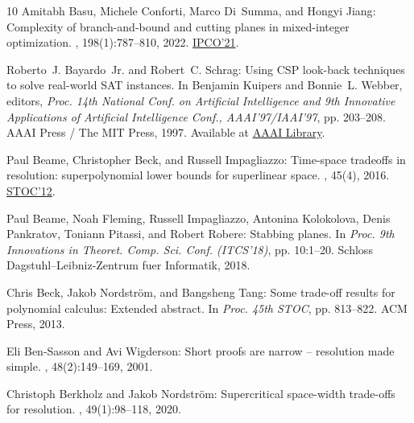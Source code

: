\begin{thebibliography}{10}
{\sc Amitabh Basu, Michele Conforti, Marco Di~Summa, and Hongyi Jiang}:
  Complexity of branch-and-bound and cutting planes in mixed-integer
  optimization.
, 198(1):787--810, 2022.
\newblock \prelim
  \href{https://doi.org/10.1007/978-3-030-73879-2\_27}{IPCO'21}.
\newblock [\epfmtdoi{10.1007/s10107-022-01789-5}]

{\sc Roberto~J. Bayardo~Jr. and Robert~C. Schrag}: Using {CSP} look-back
  techniques to solve real-world {SAT} instances.
\newblock In {\sc Benjamin Kuipers and Bonnie~L. Webber}, editors, {\em Proc.
  14th National Conf. on Artificial Intelligence and 9th Innovative
  Applications of Artificial Intelligence Conf., {AAAI}'97/{IAAI}'97}, pp.
  203--208. {AAAI} Press / The {MIT} Press, 1997.
\newblock Available at
  \href{http://www.aaai.org/Library/AAAI/1997/aaai97-032.php}{AAAI Library}.

{\sc Paul Beame, Christopher Beck, and Russell Impagliazzo}: Time-space
  tradeoffs in resolution: superpolynomial lower bounds for superlinear space.
, 45(4), 2016.
\newblock \prelim \href{https://doi.org/10.1145/2213977.2213999}{STOC'12}.
\newblock [\epfmtdoi{10.1137/130914085}]

{\sc Paul Beame, Noah Fleming, Russell Impagliazzo, Antonina Kolokolova, Denis
  Pankratov, Toniann Pitassi, and Robert Robere}: Stabbing planes.
\newblock In {\em Proc. 9th Innovations in Theoret. Comp. Sci. Conf.
  (ITCS'18)}, pp. 10:1--20. Schloss Dagstuhl--Leibniz-Zentrum fuer Informatik,
  2018.

{\sc Chris Beck, Jakob Nordstr{\"{o}}m, and Bangsheng Tang}: Some trade-off
  results for polynomial calculus: {E}xtended abstract.
\newblock In {\em Proc. 45th STOC}, pp. 813--822. ACM Press, 2013.
\newblock [\epfmtdoi{10.1145/2488608.2488711}]

{\sc Eli Ben{-}Sasson and Avi Wigderson}: Short proofs are narrow -- resolution
  made simple.
, 48(2):149--169, 2001.
\newblock [\epfmtdoi{10.1145/375827.375835}]

{\sc Christoph Berkholz and Jakob Nordstr{\"{o}}m}: Supercritical space-width
  trade-offs for resolution.
, 49(1):98--118, 2020.
\newblock [\epfmtdoi{10.1137/16M1109072}]


\end{thebibliography}
